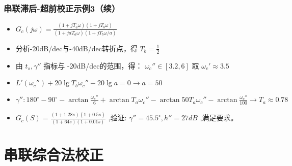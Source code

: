 \documentclass[table]{beamer}
\begin{document}
\begin{frame}
\frametitle{串联滞后-超前校正示例3（续）}
\label{sec-4-2-8}

\begin{itemize}
\item $G_c(j\omega)=\frac{(1+jT_a\omega)(1+jT_b\omega)}{(1+jaT_a\omega)(1+jT_b\omega/a)}$
\item 分析-20dB/dec与-40dB/dec转折点，得 $T_b=\frac{1}{2}$
\item 由 $t_s,\gamma''$ 指标与 -20dB/dec的范围，得： $\omega_c'' \in [3.2,6]$ 取 $\omega_c'\approx 3.5$
\item $L'(\omega_c'')+20\lg T_b\omega_c''-20\lg a=0\to a=50$
\item $\gamma'': 180^{\circ}-90^{\circ}-\arctan \frac{\omega_c''}{6}+\arctan T_a\omega_c''-\arctan 50T_a\omega_c''-\arctan\frac{\omega_c''}{100}\to T_a\approx 0.78$
\item $G_c(S)=\frac{(1+1.28s)(1+0.5s)}{(1+64s)(1+0.01s)}$ ,验证: $\gamma''=45.5^{\circ},h''=27dB$ ,满足要求。
\end{itemize}
\end{frame}
\section{串联综合法校正}
\label{sec-5}
\end{document}

